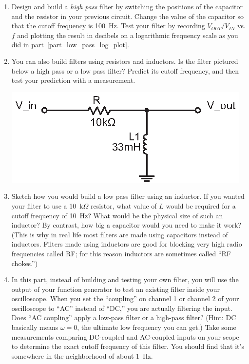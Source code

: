 \begin{enumerate}[wide]
\item Design and build a \textit{high pass} filter by switching the positions of the capacitor and the resistor in your previous circuit.  Change the value of the capacitor so that the cutoff frequency is 100~Hz.  Test your filter by recording $V_{OUT}/V_{IN}$ vs. $f$ and plotting the result in decibels on a logarithmic frequency scale as you did in part~\ref{part_low_pass_log_plot}.  

\item You can also build filters using resistors and inductors.  Is the filter pictured below a high pass or a low pass filter?  Predict its cutoff frequency, and then test your prediction with a measurement.
\begin{center}
\includegraphics{filters/high_pass_filter_LR.eps}
\end{center}

\item Sketch how you would build a low pass filter using an inductor.  If you wanted your filter to use a 10~k$\Omega$ resistor, what value of $L$ would be required for a cutoff frequency of 10~Hz?  What would be the physical size of such an inductor?  By contrast, how big a capacitor would you need to make it work?  (This is why in real life most filters are made using capacitors instead of inductors.  Filters made using inductors are good for blocking very high radio frequencies called RF; for this reason inductors are sometimes called ``RF chokes.'')  

\item In this part, instead of building and testing your own filter, you will use the output of your function generator to test an existing filter inside your oscilloscope.  When you set the ``coupling'' on channel 1 or channel 2 of your oscilloscope to ``AC'' instead of ``DC,'' you are actually filtering the input.  Does ``AC coupling'' apply a low-pass filter or a high-pass filter?  (Hint: DC basically means $\omega=0$, the ultimate low frequency you can get.) Take some measurements comparing DC-coupled and AC-coupled inputs on your scope to determine the exact cutoff frequency of this filter.  You should find that it's somewhere in the neighborhood of about 1~Hz.


\end{enumerate}
